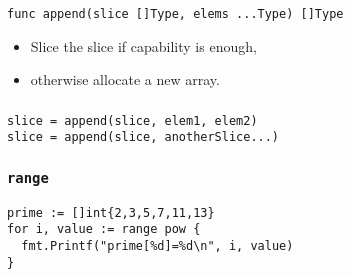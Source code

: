 \documentclass[xetex,mathserif,serif,12pt]{beamer}
\begin{document}

\begin{frame}[fragile]
\frametitle{}

  \begin{beamer@nomargin}
    \begin{lstlisting}
func append(slice []Type, elems ...Type) []Type
    \end{lstlisting}
  \end{beamer@nomargin}

  \begin{itemize}
  \item Slice the slice if capability is enough,
  \item otherwise allocate a new array.
  \end{itemize}
\end{frame}

\begin{frame}[fragile]
\frametitle{}

  \begin{beamer@nomargin}
    \begin{lstlisting}
slice = append(slice, elem1, elem2)
slice = append(slice, anotherSlice...)
    \end{lstlisting}
  \end{beamer@nomargin}
\end{frame}

\begin{frame}[fragile]
  \frametitle{\texttt{range}}

  \begin{beamer@nomargin}
    \begin{lstlisting}
prime := []int{2,3,5,7,11,13}
for i, value := range pow {
  fmt.Printf("prime[%d]=%d\n", i, value)
}
    \end{lstlisting}
  \end{beamer@nomargin}
\end{frame}
\end{document}
